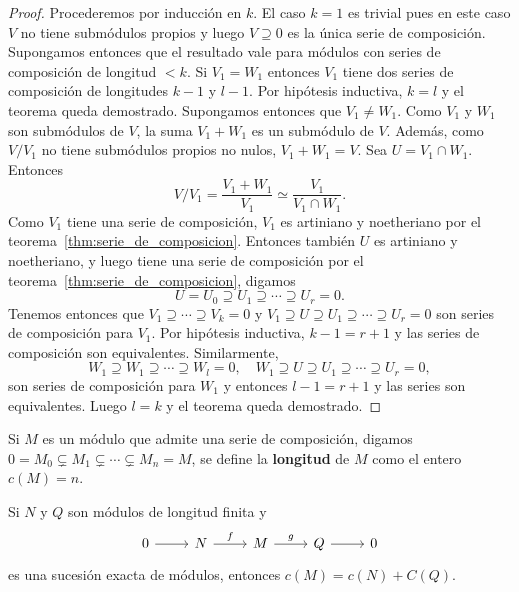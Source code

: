 \begin{proof}
	Procederemos por inducción en $k$. El caso $k=1$ es trivial pues en este
	caso $V$ no tiene submódulos propios y luego $V\supseteq 0$ es la única
	serie de composición. Supongamos entonces que el resultado vale para
	módulos con series de composición de longitud $<k$.  Si $V_1=W_1$ entonces
	$V_1$ tiene dos series de composición de longitudes $k-1$ y $l-1$. Por
	hipótesis inductiva, $k=l$ y el teorema queda demostrado.  Supongamos
	entonces que $V_1\ne W_1$. Como $V_1$ y $W_1$ son submódulos de $V$, la
	suma $V_1+W_1$ es un submódulo de $V$. Además, como $V/V_1$ no tiene
	submódulos propios no nulos, $V_1+W_1=V$. Sea $U=V_1\cap W_1$. Entonces
	\[
		V/V_1=\frac{V_1+W_1}{V_1}\simeq\frac{V_1}{V_1\cap W_1}.
	\]
	Como $V_1$ tiene una serie de composición, $V_1$ es artiniano y
	noetheriano por el teorema~\ref{thm:serie_de_composicion}. Entonces
	también $U$ es artiniano y noetheriano, y luego tiene una serie de
	composición por el teorema~\ref{thm:serie_de_composicion}, digamos
	\[
		U=U_0\supseteq U_1\supseteq\cdots\supseteq U_r=0.
	\]
	Tenemos entonces que 
	$V_1\supseteq\cdots\supseteq V_k=0$ y 
	$V_1\supseteq U\supseteq U_1\supseteq\cdots\supseteq U_r=0$ 
	son series de composición para $V_1$. Por hipótesis inductiva,
	$k-1=r+1$ y las series de composición son equivalentes. Similarmente, 
	\[
		W_1\supseteq W_1\supseteq\cdots\supseteq W_l=0,
		\quad
		W_1\supseteq U\supseteq U_1\supseteq\cdots\supseteq U_{r}=0,
	\]
	son series de composición para $W_1$ y entonces $l-1=r+1$ y las series son
	equivalentes. Luego $l=k$ y el teorema queda demostrado.
\end{proof}

\begin{definition}
Si $M$ es un módulo que admite una serie de composición, digamos
$0=M_0\subsetneq M_1\subsetneq\cdots\subsetneq M_n=M$, 
se define la \textbf{longitud} de $M$ como el entero $c(M)=n$.
\end{definition}

\begin{exercise}
	Si $N$ y $Q$ son módulos de longitud finita y 
	\[
	\begin{tikzcd}
		0 \arrow[r]
		& N \arrow{r}{f}
		& M \arrow{r}{g}
		& Q \arrow[r]
		& 0
	\end{tikzcd}
	\]
	es una sucesión exacta de módulos, entonces $c(M)=c(N)+C(Q)$.
\end{exercise}


